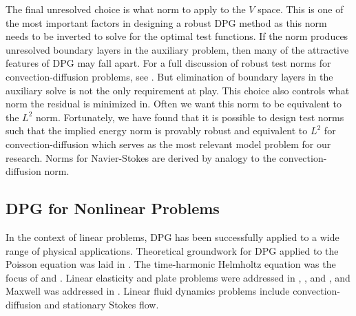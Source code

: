 \documentclass[preprint,12pt]{elsarticle}
\begin{document}
The final unresolved choice is what norm to apply to the $V$ space.
This is one of the most important factors in designing a robust DPG method as this norm needs to be inverted to solve for the optimal test functions.
If the norm produces unresolved boundary layers in the auxiliary problem, then many of the attractive features of DPG may fall apart.
For a full discussion of robust test norms for convection-diffusion problems, see \cite{DemkowiczHeuer,ChanHeuerThanhDemkowicz2012}.
But elimination of boundary layers in the auxiliary solve is not the only requirement at play. 
This choice also controls what norm the residual is minimized in. 
Often we want this norm to be equivalent to the $L^2$ norm.
Fortunately, we have found that it is possible to design test norms such that the implied energy norm 
is provably robust and equivalent to $L^2$ for convection-diffusion which
serves as the most relevant model problem for our research.
Norms for Navier-Stokes are derived by analogy to the convection-diffusion norm.


\subsection{DPG for Nonlinear Problems}
In the context of linear problems, DPG has been successfully applied to a wide range of physical applications.  
Theoretical groundwork for DPG applied to the Poisson equation was laid in \cite{DPGPoisson}.  The time-harmonic Helmholtz equation was the focus of \cite{DPGHelmholtz, Gopalakrishnan2014} and \cite{DPG4}.  Linear elasticity and plate problems were addressed in \cite{BramwellDPG}, \cite{NiemiBramwellDemkowicz10}, and \cite{BramwellDemkowiczQiu10}, and Maxwell was addressed in \cite{DPGCloaking, WohlmuthReport}.  Linear fluid dynamics problems include convection-diffusion\cite{DPG3,DemkowiczHeuer,ChanHeuerThanhDemkowicz2012,Chan2013,EllisLC} and stationary Stokes flow\cite{DPGStokes,EllisLC}.
\end{document}
